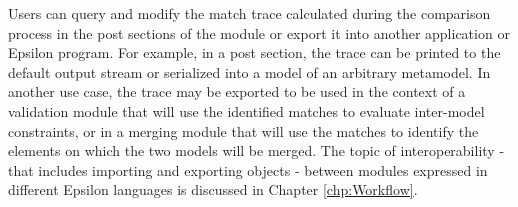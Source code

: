 Users can query and modify the match trace calculated during the comparison process in the post sections of the module or export it into another application or Epsilon program. For example, in a post section, the trace can be printed to the default output stream or serialized into a model of an arbitrary metamodel. In another use case, the trace may be exported to be used in the context of a validation module that will use the identified matches to evaluate inter-model constraints, or in a merging module that will use the matches to identify the elements on which the two models will be merged. The topic of interoperability - that includes importing and exporting objects - between modules expressed in different Epsilon languages is discussed in Chapter \ref{chp:Workflow}.